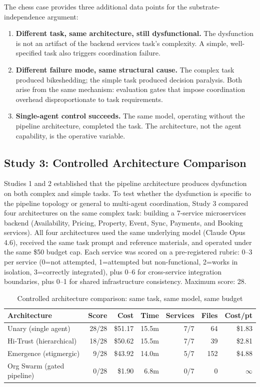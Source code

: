 \documentclass[11pt,a4paper]{article}
\begin{document}
The chess case provides three additional data points for the substrate-independence argument:

\begin{enumerate}
\item \textbf{Different task, same architecture, still dysfunctional.} The dysfunction is not an artifact of the backend services task's complexity. A simple, well-specified task also triggers coordination failure.
\item \textbf{Different failure mode, same structural cause.} The complex task produced bikeshedding; the simple task produced decision paralysis. Both arise from the same mechanism: evaluation gates that impose coordination overhead disproportionate to task requirements.
\item \textbf{Single-agent control succeeds.} The same model, operating without the pipeline architecture, completed the task. The architecture, not the agent capability, is the operative variable.
\end{enumerate}

\subsection{Study 3: Controlled Architecture Comparison}
\label{sec:arch-comparison}

Studies 1 and 2 established that the pipeline architecture produces dysfunction on both complex and simple tasks. To test whether the dysfunction is specific to the pipeline topology or general to multi-agent coordination, Study 3 compared four architectures on the same complex task: building a 7-service microservices backend (Availability, Pricing, Property, Event, Sync, Payments, and Booking services). All four architectures used the same underlying model (Claude Opus 4.6), received the same task prompt and reference materials, and operated under the same \$50 budget cap. Each service was scored on a pre-registered rubric: 0--3 per service (0=not attempted, 1=attempted but non-functional, 2=works in isolation, 3=correctly integrated), plus 0--6 for cross-service integration boundaries, plus 0--1 for shared infrastructure consistency. Maximum score: 28.

\begin{table}[H]
\centering
\caption{Controlled architecture comparison: same task, same model, same budget}
\label{tab:arch-comparison}
\small
\begin{tabular}{@{}p{2.5cm}rrrrrr@{}}
\toprule
\textbf{Architecture} & \textbf{Score} & \textbf{Cost} & \textbf{Time} & \textbf{Services} & \textbf{Files} & \textbf{Cost/pt} \\
\midrule
Unary (single agent) & 28/28 & \$51.17 & 15.5m & 7/7 & 64 & \$1.83 \\
Hi-Trust (hierarchical) & 18/28 & \$50.62 & 15.5m & 7/7 & 39 & \$2.81 \\
Emergence (stigmergic) & 9/28 & \$43.92 & 14.0m & 5/7 & 152 & \$4.88 \\
Org Swarm (gated pipeline) & 0/28 & \$1.90 & 6.8m & 0/7 & 0 & $\infty$ \\
\bottomrule
\end{tabular}
\end{table}
\end{document}
